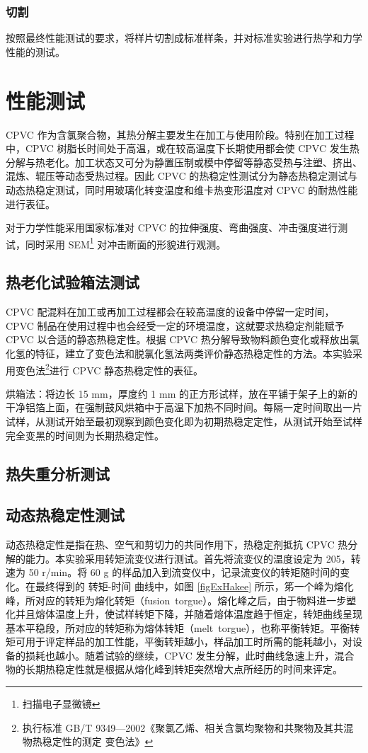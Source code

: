 \subsubsection{切割}
按照最终性能测试的要求，将样片切割成标准样条，并对标准实验进行热学和力学性能的测试。


\section{性能测试}
CPVC 作为含氯聚合物，其热分解主要发生在加工与使用阶段。特别在加工过程中，CPVC 树脂长时间处于高温，或在较高温度下长期使用都会使 CPVC 发生热分解与热老化。加工状态又可分为静置压制或模中停留等静态受热与注塑、挤出、混炼、辊压等动态受热过程。因此 CPVC 的热稳定性测试分为静态热稳定测试与动态热稳定测试，同时用玻璃化转变温度和维卡热变形温度对 CPVC 的耐热性能进行表征。\par
对于力学性能采用国家标准对 CPVC 的拉伸强度、弯曲强度、冲击强度进行测试，同时采用 SEM\footnote{扫描电子显微镜} 对冲击断面的形貌进行观测。

\subsection{热老化试验箱法测试}
CPVC 配混料在加工或再加工过程都会在较高温度的设备中停留一定时间，CPVC 制品在使用过程中也会经受一定的环境温度，这就要求热稳定剂能赋予 CPVC 以合适的静态热稳定性。根据 CPVC 热分解导致物料颜色变化或释放出氯化氢的特征，建立了变色法和脱氯化氢法两类评价静态热稳定性的方法。本实验采用变色法\footnote{执行标准 GB/T 9349—2002《聚氯乙烯、相关含氯均聚物和共聚物及其共混物热稳定性的测定 变色法》}进行 CPVC 静态热稳定性的表征。\par
烘箱法：将边长 15 mm，厚度约 1 mm 的正方形试样，放在平铺于架子上的新的干净铝箔上面，在强制鼓风烘箱中于高温下加热不同时间。每隔一定时间取出一片试样，从测试开始至最初观察到颜色变化即为初期热稳定定性，从测试开始至试样完全变黑的时间则为长期热稳定性。

\subsection{热失重分析测试}

\subsection{动态热稳定性测试}\label{sectionHakee}
动态热稳定性是指在热、空气和剪切力的共同作用下，热稳定剂抵抗 CPVC 热分解的能力。本实验采用转矩流变仪进行测试。首先将流变仪的温度设定为 205\cd，转速为 50 r/min。将 60 g 的样品加入到流变仪中，记录流变仪的转矩随时间的变化。在最终得到的 转矩-时间 曲线中，如图 \ref{figExHakee} 所示，笫一个峰为熔化峰，所对应的转矩为熔化转矩（fusion torgue）。熔化峰之后，由于物料进一步塑化并且熔体温度上升，使试样转矩下降，并随着熔体温度趋于恒定，转矩曲线呈现基本平稳段，所对应的转矩称为熔体转矩（melt torgue），也称平衡转矩。平衡转矩可用于评定样品的加工性能，平衡转矩越小，样品加工时所需的能耗越小，对设备的损耗也越小。随着试验的继续，CPVC 发生分解，此时曲线急速上升，混合物的长期热稳定性就是根据从熔化峰到转矩突然增大点所经历的时间来评定。


